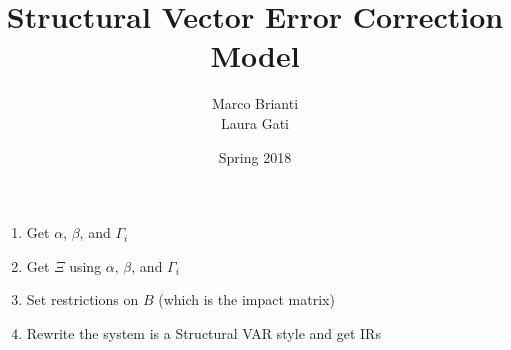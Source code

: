 \documentclass{article}
\title{Structural Vector Error Correction Model}
\author{Marco Brianti\\Laura Gati}
\date{Spring 2018}
\begin{document}
	
	\maketitle
	
	\begin{enumerate}
		\item Get $\alpha$, $\beta$, and $\Gamma_i$
		\item Get $\Xi$ using $\alpha$, $\beta$, and $\Gamma_i$
		\item Set restrictions on $B$ (which is the impact matrix) 
		\item Rewrite the system is a Structural VAR style and get IRs
	\end{enumerate}

	


	
	
\end{document}
